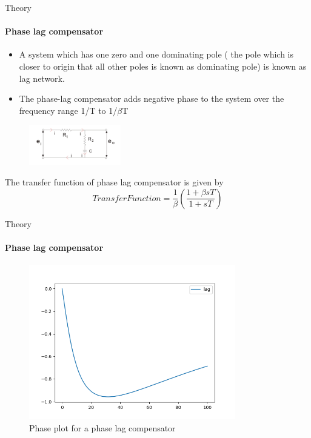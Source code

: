 \documentclass{beamer}
\begin{document}
\begin{frame}{Theory}
\framesubtitle{Phase lag compensator}
\begin{itemize}
\item A system which has one zero and one dominating pole ( the pole which is closer to origin that all other poles is known as dominating pole) is known as lag network.
\item The phase-lag compensator adds negative phase to the system over the frequency range 1/T to 1/$\beta$T
\end{itemize}
\begin{figure}[h]
\centering
\includegraphics[width=4cm]{Screenshot (26).png}
\end{figure}
The transfer function of phase lag compensator is given by
\[Transfer Function = \frac{1}{\beta}(\frac{1+\beta s T}{1+ s T})\]
\end{frame}

\begin{frame}{Theory}
\framesubtitle{Phase lag compensator}
\begin{figure}[h]
\centering
\includegraphics[width=9cm]{lag.png}
\caption{Phase plot for a phase lag compensator}
\end{figure}

\end{frame}
\end{document}
